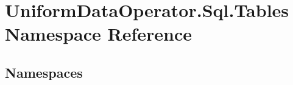 \hypertarget{namespace_uniform_data_operator_1_1_sql_1_1_tables}{}\section{Uniform\+Data\+Operator.\+Sql.\+Tables Namespace Reference}
\label{namespace_uniform_data_operator_1_1_sql_1_1_tables}
\subsection*{Namespaces}
\begin{DoxyCompactItemize}
\end{DoxyCompactItemize}
